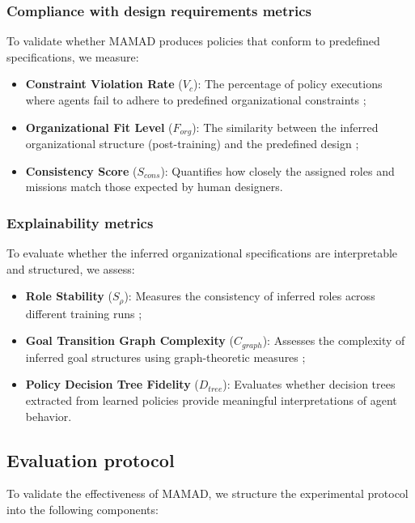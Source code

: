 \documentclass[pdflatex,sn-mathphys-num]{sn-jnl}%
\theoremstyle{thmstyleone}%
\theoremstyle{thmstyletwo}%
\theoremstyle{thmstylethree}%
\begin{document}
\subsubsection{Compliance with design requirements metrics}
To validate whether MAMAD produces policies that conform to predefined specifications, we measure:
\begin{itemize}
    \item \textbf{Constraint Violation Rate} ($V_c$): The percentage of policy executions where agents fail to adhere to predefined organizational constraints ;
    \item \textbf{Organizational Fit Level} ($F_{org}$): The similarity between the inferred organizational structure (post-training) and the predefined design ;
    \item \textbf{Consistency Score} ($S_{cons}$): Quantifies how closely the assigned roles and missions match those expected by human designers.
\end{itemize}

\subsubsection{Explainability metrics}
To evaluate whether the inferred organizational specifications are interpretable and structured, we assess:
\begin{itemize}
    \item \textbf{Role Stability} ($S_{\rho}$): Measures the consistency of inferred roles across different training runs ;
    \item \textbf{Goal Transition Graph Complexity} ($C_{graph}$): Assesses the complexity of inferred goal structures using graph-theoretic measures ;
    \item \textbf{Policy Decision Tree Fidelity} ($D_{tree}$): Evaluates whether decision trees extracted from learned policies provide meaningful interpretations of agent behavior.
\end{itemize}

\subsection{Evaluation protocol}

To validate the effectiveness of MAMAD, we structure the experimental protocol into the following components:
\end{document}
